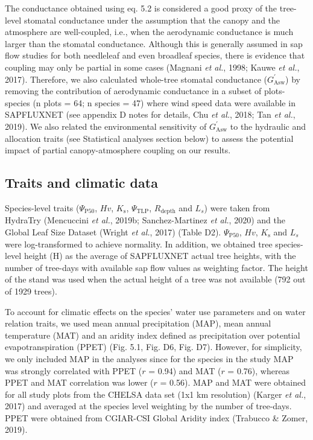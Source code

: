 \documentclass[11pt,twoside]{reedthesis}
\begin{document}
The conductance obtained using eq. 5.2 is considered a good proxy of the
tree-level stomatal conductance under the assumption that the canopy and
the atmosphere are well-coupled, i.e., when the aerodynamic conductance
is much larger than the stomatal conductance. Although this is generally
assumed in sap flow studies for both needleleaf and even broadleaf
species, there is evidence that coupling may only be partial in some
cases (Magnani \emph{et al.}, 1998; Kauwe \emph{et al.}, 2017).
Therefore, we also calculated whole-tree stomatal conductance
(\(G_{\text{Asw}}^{'}\)) by removing the contribution of aerodynamic
conductance in a subset of plots-species (n plots = 64; n species = 47)
where wind speed data were available in SAPFLUXNET (see appendix D notes
for details, Chu \emph{et al.}, 2018; Tan \emph{et al.}, 2019). We also
related the environmental sensitivity of \(G_{\text{Asw}}^{'}\) to the
hydraulic and allocation traits (see Statistical analyses section below)
to assess the potential impact of partial canopy-atmosphere coupling on
our results.\par

\subsection{Traits and climatic data}\label{traits-and-climatic-data}

Species-level traits (\textbar{}\(\Psi_{\text{P50}}\)\textbar{}, \(Hv\),
\(K_\text{s}\), \textbar{}\(\Psi_{\text{TLP}}\)\textbar{},
\(R_{\text{depth}}\) and \(L_s\)) were taken from HydraTry (Mencuccini
\emph{et al.}, 2019b; Sanchez-Martinez \emph{et al.}, 2020) and the
Global Leaf Size Dataset (Wright \emph{et al.}, 2017) (Table D2).
\textbar{}\(\Psi_{\text{P50}}\)\textbar{}, \(Hv\), \(K_\text{s}\) and
\(L_s\) were log-transformed to achieve normality. In addition, we
obtained tree species-level height (H) as the average of SAPFLUXNET
actual tree heights, with the number of tree-days with available sap
flow values as weighting factor. The height of the stand was used when
the actual height of a tree was not available (792 out of 1929
trees).\par

To account for climatic effects on the species' water use parameters and
on water relation traits, we used mean annual precipitation (MAP), mean
annual temperature (MAT) and an aridity index defined as precipitation
over potential evapotranspiration (PPET) (Fig. 5.1, Fig. D6, Fig. D7).
However, for simplicity, we only included MAP in the analyses since for
the species in the study MAP was strongly correlated with PPET (\(r\) =
0.94) and MAT (\(r\) = 0.76), whereas PPET and MAT correlation was lower
(\(r\) = 0.56). MAP and MAT were obtained for all study plots from the
CHELSA data set (1x1 km resolution) (Karger \emph{et al.}, 2017) and
averaged at the species level weighting by the number of tree-days. PPET
were obtained from CGIAR-CSI Global Aridity index (Trabucco \& Zomer,
2019).\par
\end{document}
